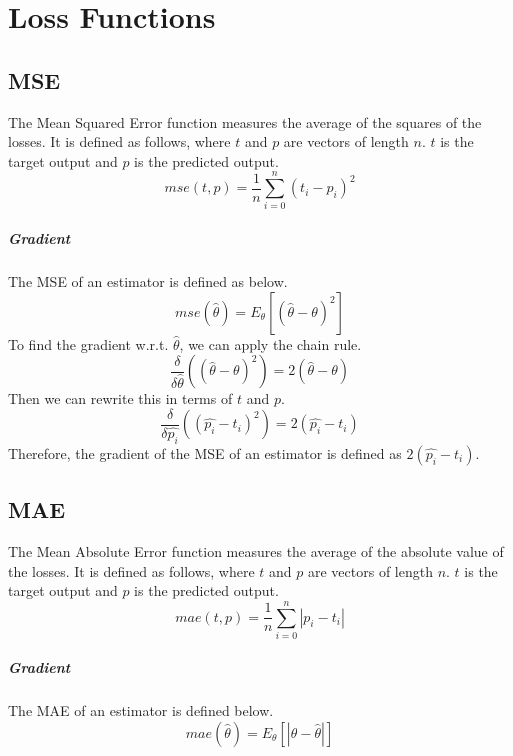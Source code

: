 \documentclass{report}
\begin{document}
    \chapter{Loss Functions}

        \section{MSE}
            The Mean Squared Error function measures the average of the squares of the losses.  It is defined as follows, where $t$ and $p$ are 
            vectors of length $n$. $t$ is the target output and $p$ is the predicted output. 
            $$mse(t, p) = \frac{1}{n} \sum_{i=0}^{n} (t_i - p_i)^2$$ 
            
            \paragraph{Gradient}
                The MSE of an estimator is defined as below\cite{wiki:Mean_squared_error}.
                $$mse(\hat{\theta}) = E_\theta [(\hat{\theta} - \theta)^2]$$
                To find the gradient w.r.t. $\hat{\theta}$, we can apply the chain rule. 
                $$\frac{\delta}{\delta{\hat{\theta}}}((\hat{\theta} - \theta)^2) = 2(\hat{\theta} - \theta)$$
                Then we can rewrite this in terms of $t$ and $p$. 
                $$\frac{\delta}{\delta{\hat{p_i}}}((\hat{p_i} - t_i)^2) = 2(\hat{p_i} - t_i)$$
                Therefore, the gradient of the MSE of an estimator is defined as $2(\hat{p_i} - t_i)$.

        \section{MAE}
            The Mean Absolute Error function measures the average of the absolute value of the losses. It is defined as follows, where $t$ and $p$
            are vectors of length $n$. $t$ is the target output and $p$ is the predicted output. 
            $$mae(t, p) = \frac{1}{n} \sum_{i=0}^{n} |p_i - t_i|$$

            \paragraph{Gradient}
                The MAE of an estimator is defined below.
                $$mae(\hat{\theta}) = E_\theta[|\theta - \hat{\theta}|]$$

    \printbibliography
\end{document}
